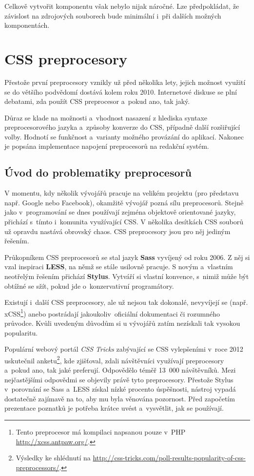 \documentclass[thesis=B,czech]{FITthesis}[2012/06/26]
\begin{document}
Celkově vytvořit komponentu však nebylo nijak náročné. Lze předpokládat, že závislost na zdrojových souborech bude minimální i~při dalších možných komponentách.


\chapter{CSS preprocesory}
Přestože první preprocesory vznikly už před několika lety, jejich možnost využití se do většího podvědomí dostává kolem roku 2010. Internetové diskuse se plní debatami, zda použít CSS preprocesor a~pokud ano, tak jaký. 

Důraz se klade na možnosti a~vhodnost nasazení z hlediska syntaxe preprocesorového jazyka a~způsoby konverze do CSS, případně další rozšiřující volby. Hodnotí se funkčnost a~varianty možného provázání do aplikací. Nakonec je popsána implementace napojení preprocesorů na redakční systém.


\section{Úvod do problematiky preprocesorů}


V momentu, kdy několik vývojářů pracuje na velikém projektu (pro představu např. Google nebo Facebook), okamžitě vývojář pozná sílu preprocesorů. Stejně jako v~programování se dnes používají zejména objektově orientované jazyky, přichází s~tímto i~komunita využívající CSS. V několika desítkách CSS souborů už opravdu nastává obrovský chaos. CSS preprocesory jsou pro něj jediným řešením.

Průkopníkem CSS preprocesorů se stal jazyk \textbf{Sass} vyvíjený od roku 2006. Z něj si vzal inspiraci \textbf{LESS}, na němž se stále usilovně pracuje. S novým a~vlastním neotřelým řešením přichází \textbf{Stylus}. Vytváří si vlastní konvence, s~nimiž může být obtížné se sžít, pokud jde o~konzervativní programátory. 

Existují i~další CSS preprocesory, ale už nejsou tak dokonalé, nevyvíjejí se (např. xCSS\footnote{Tento preprocesor má kompilaci napsanou pouze v~PHP \url{http://xcss.antpaw.org/}.}) anebo postrádají jakoukoliv~oficiální dokumentaci či rozumného průvodce. Kvůli uvedeným důvodům si u vývojářů zatím nezískali tak vysokou popularitu.

Populární webový portál \textit{CSS Tricks} zabývající se CSS vylepšeními v~roce 2012 uskutečnil anketu\footnote{Výsledky ke shlédnutí na \url{http://css-tricks.com/poll-results-popularity-of-css-preprocessors/}.}, kde zjišťoval, zdali návštěvníci využívají preprocesory a~pokud ano, tak jaké preferují. Odpovědělo téměř 13~000 návštěvníků. Mezi nejčastějšími odpovědmi se objevily právě tyto preprocesory. Přestože Stylus v~porovnání se Sass a~LESS získal nízké procento úspěšnosti, nástroj vypadá dostatečně zajímavě na to, aby mu byla věnována pozornost. Před započetím prezentace poznatků je potřeba krátce uvést a~vysvětlit, jak se používají. 
\end{document}
